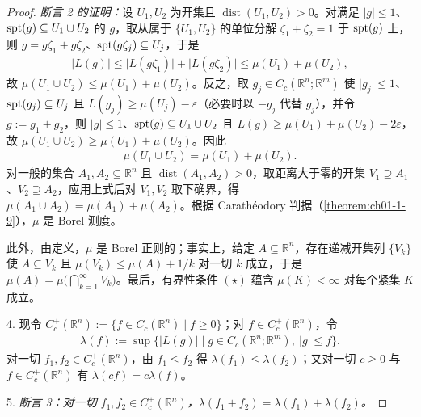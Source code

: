 \documentclass[../../main.tex]{subfiles}%
\begin{document}
\begin{proof}
\emph{断言 2 的证明：}设 $U_1,U_2$ 为开集且 $\operatorname{dist}(U_1,U_2)>0$。对满足 $\lvert g\rvert\leqslant1$、$\operatorname{spt}(g)\subseteq U_1\cup U_2$ 的 $g$，取从属于 $\{U_1,U_2\}$ 的单位分解 $\zeta_1+\zeta_2=1$ 于 $\operatorname{spt}(g)$ 上，则 $g=g\zeta_1+g\zeta_2$、$\operatorname{spt}(g\zeta_j)\subseteq U_j$，于是
\begin{align*}
\lvert L(g)\rvert\leqslant\lvert L(g\zeta_1)\rvert+\lvert L(g\zeta_2)\rvert\leqslant\mu(U_1)+\mu(U_2),
\end{align*}
故 $\mu(U_1\cup U_2)\leqslant\mu(U_1)+\mu(U_2)$。反之，取 $g_j\in C_c(\mathbb{R}^n;\mathbb{R}^m)$ 使 $\lvert g_j\rvert\leqslant1$、$\operatorname{spt}(g_j)\subseteq U_j$ 且 $L(g_j)\geqslant\mu(U_j)-\varepsilon$（必要时以 $-g_j$ 代替 $g_j$），并令 $g:=g_1+g_2$，则 $\lvert g\rvert\leqslant1$、$\operatorname{spt}(g)\subseteq U_1\cup U_2$ 且 $L(g)\geqslant\mu(U_1)+\mu(U_2)-2\varepsilon$，故 $\mu(U_1\cup U_2)\geqslant\mu(U_1)+\mu(U_2)$。因此
\begin{align*}
\mu(U_1\cup U_2)=\mu(U_1)+\mu(U_2).
\end{align*}
对一般的集合 $A_1,A_2\subseteq\mathbb{R}^n$ 且 $\operatorname{dist}(A_1,A_2)>0$，取距离大于零的开集 $V_1\supseteq A_1$、$V_2\supseteq A_2$，应用上式后对 $V_1,V_2$ 取下确界，得 $\mu(A_1\cup A_2)=\mu(A_1)+\mu(A_2)$。根据 Carathéodory 判据（\cref{theorem:ch01-1-9}），$\mu$ 是 Borel 测度。%

此外，由定义，$\mu$ 是 Borel 正则的；事实上，给定 $A\subseteq\mathbb{R}^n$，存在递减开集列 $\{V_k\}$ 使 $A\subseteq V_k$ 且 $\mu(V_k)\leqslant\mu(A)+1/k$ 对一切 $k$ 成立，于是 $\mu(A)=\mu\bigl(\bigcap_{k=1}^{\infty}V_k\bigr)$。最后，有界性条件 $(\star)$ 蕴含 $\mu(K)<\infty$ 对每个紧集 $K$ 成立。

4. 现令 $C_c^+(\mathbb{R}^n):=\{f\in C_c(\mathbb{R}^n)\mid f\geqslant0\}$；对 $f\in C_c^+(\mathbb{R}^n)$，令
\begin{align*}
\lambda(f):=\sup\{\lvert L(g)\rvert\mid g\in C_c(\mathbb{R}^n;\mathbb{R}^m),\ \lvert g\rvert\leqslant f\}.
\end{align*}
对一切 $f_1,f_2\in C_c^+(\mathbb{R}^n)$，由 $f_1\leqslant f_2$ 得 $\lambda(f_1)\leqslant\lambda(f_2)$；又对一切 $c\geqslant0$ 与 $f\in C_c^+(\mathbb{R}^n)$ 有 $\lambda(cf)=c\lambda(f)$。

5. \emph{断言 3：对一切 $f_1,f_2\in C_c^+(\mathbb{R}^n)$，$\lambda(f_1+f_2)=\lambda(f_1)+\lambda(f_2)$。}


\end{proof}
\end{document}
